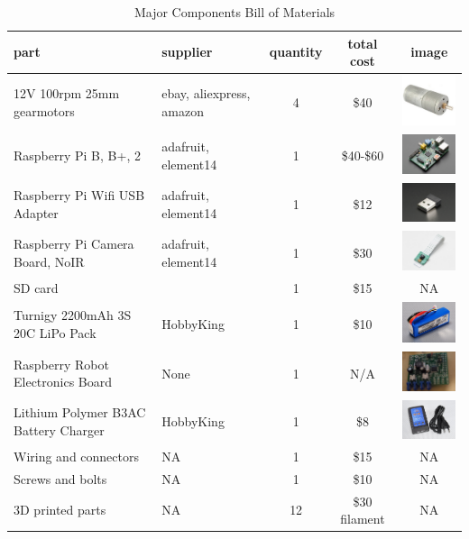 \documentclass[12pt,titlepage,oneside]{memoir}
\begin{document}
\begin{table}[!h]
\begin{tabular}{p{4cm} | p{3.5cm} | c | c | c}
part & supplier &  quantity &   total cost & image\\
\hline
12V 100rpm 25mm gearmotors & ebay, aliexpress, amazon&  4  & \$40 & \includegraphics[width=80px]{picture/motor.png}\\
Raspberry Pi B, B+, 2 & adafruit, element14 & 1 & \$40-\$60 & \includegraphics[width=80px]{picture/pi.jpg}\\
Raspberry Pi Wifi USB Adapter & adafruit, element14 & 1 & \$12 & \includegraphics[width=80px]{picture/piwifi.jpg}\\
Raspberry Pi Camera Board, NoIR & adafruit, element14 & 1 & \$30 &  \includegraphics[width=80px]{picture/picam.jpg}\\
SD card & & 1 & \$15 & NA\\
Turnigy 2200mAh 3S 20C LiPo Pack & HobbyKing & 1 & \$10 &  \includegraphics[width=80px]{picture/lipo.jpg}\\
Raspberry Robot Electronics Board & None & 1 & N/A &  \includegraphics[width=80px]{picture/piboard.jpg}\\
Lithium Polymer B3AC Battery Charger & HobbyKing & 1 & \$8 & \includegraphics[width=80px]{picture/charger.jpg}\\
Wiring and connectors & NA & 1 & \$15 & NA \\
Screws and bolts & NA &1 & \$10 & NA \\
3D printed parts & NA & 12 & \$30 filament & NA \\
\end{tabular}
\caption{Major Components Bill of Materials}
\label{table:BOM}
\end{table}
\end{document}
